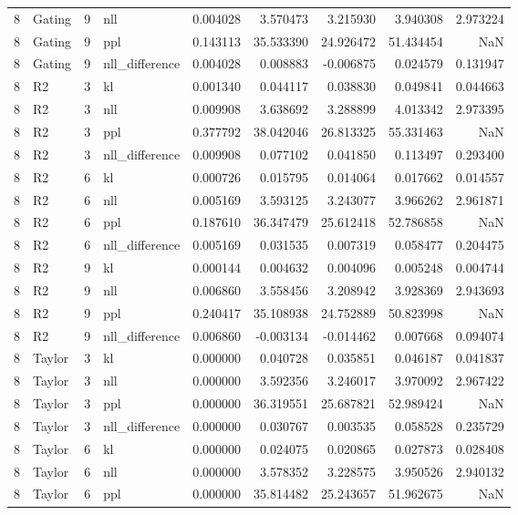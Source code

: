 \begin{tabular}{rlrlrrrrr}
8 & Gating & 9 & nll & 0.004028 & 3.570473 & 3.215930 & 3.940308 & 2.973224 \\
8 & Gating & 9 & ppl & 0.143113 & 35.533390 & 24.926472 & 51.434454 & NaN \\
8 & Gating & 9 & nll_difference & 0.004028 & 0.008883 & -0.006875 & 0.024579 & 0.131947 \\
8 & R2 & 3 & kl & 0.001340 & 0.044117 & 0.038830 & 0.049841 & 0.044663 \\
8 & R2 & 3 & nll & 0.009908 & 3.638692 & 3.288899 & 4.013342 & 2.973395 \\
8 & R2 & 3 & ppl & 0.377792 & 38.042046 & 26.813325 & 55.331463 & NaN \\
8 & R2 & 3 & nll_difference & 0.009908 & 0.077102 & 0.041850 & 0.113497 & 0.293400 \\
8 & R2 & 6 & kl & 0.000726 & 0.015795 & 0.014064 & 0.017662 & 0.014557 \\
8 & R2 & 6 & nll & 0.005169 & 3.593125 & 3.243077 & 3.966262 & 2.961871 \\
8 & R2 & 6 & ppl & 0.187610 & 36.347479 & 25.612418 & 52.786858 & NaN \\
8 & R2 & 6 & nll_difference & 0.005169 & 0.031535 & 0.007319 & 0.058477 & 0.204475 \\
8 & R2 & 9 & kl & 0.000144 & 0.004632 & 0.004096 & 0.005248 & 0.004744 \\
8 & R2 & 9 & nll & 0.006860 & 3.558456 & 3.208942 & 3.928369 & 2.943693 \\
8 & R2 & 9 & ppl & 0.240417 & 35.108938 & 24.752889 & 50.823998 & NaN \\
8 & R2 & 9 & nll_difference & 0.006860 & -0.003134 & -0.014462 & 0.007668 & 0.094074 \\
8 & Taylor & 3 & kl & 0.000000 & 0.040728 & 0.035851 & 0.046187 & 0.041837 \\
8 & Taylor & 3 & nll & 0.000000 & 3.592356 & 3.246017 & 3.970092 & 2.967422 \\
8 & Taylor & 3 & ppl & 0.000000 & 36.319551 & 25.687821 & 52.989424 & NaN \\
8 & Taylor & 3 & nll_difference & 0.000000 & 0.030767 & 0.003535 & 0.058528 & 0.235729 \\
8 & Taylor & 6 & kl & 0.000000 & 0.024075 & 0.020865 & 0.027873 & 0.028408 \\
8 & Taylor & 6 & nll & 0.000000 & 3.578352 & 3.228575 & 3.950526 & 2.940132 \\
8 & Taylor & 6 & ppl & 0.000000 & 35.814482 & 25.243657 & 51.962675 & NaN \\

\end{tabular}
